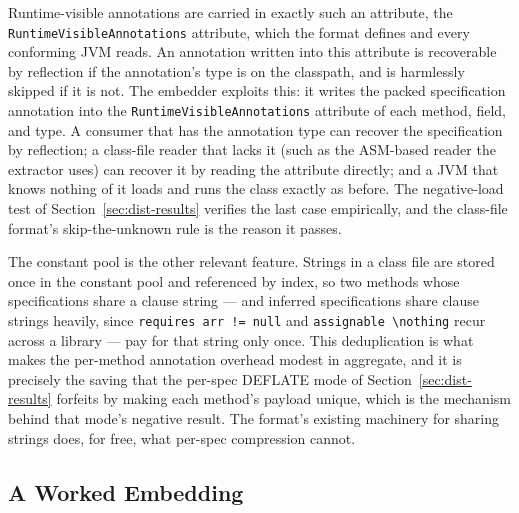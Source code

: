 Runtime-visible annotations are carried in exactly such an attribute, the
\texttt{RuntimeVisibleAnnotations} attribute, which the format defines and every
conforming JVM reads. An annotation written into this attribute is recoverable
by reflection if the annotation's type is on the classpath, and is harmlessly
skipped if it is not. The embedder exploits this: it writes the packed
specification annotation into the \texttt{RuntimeVisibleAnnotations} attribute of
each method, field, and type. A consumer that has the annotation type can recover
the specification by reflection; a class-file reader that lacks it (such as the
ASM-based reader the extractor uses) can recover it by reading the attribute
directly; and a JVM that knows nothing of it loads and runs the class exactly as
before. The negative-load test of Section~\ref{sec:dist-results} verifies the
last case empirically, and the class-file format's skip-the-unknown rule is the
reason it passes.

The constant pool is the other relevant feature. Strings in a class file are
stored once in the constant pool and referenced by index, so two methods whose
specifications share a clause string --- and inferred specifications share clause
strings heavily, since \texttt{requires arr != null} and \texttt{assignable
\textbackslash nothing} recur across a library --- pay for that string only once.
This deduplication is what makes the per-method annotation overhead modest in
aggregate, and it is precisely the saving that the per-spec DEFLATE mode of
Section~\ref{sec:dist-results} forfeits by making each method's payload unique,
which is the mechanism behind that mode's negative result. The format's existing
machinery for sharing strings does, for free, what per-spec compression cannot.

\subsection{A Worked Embedding}

